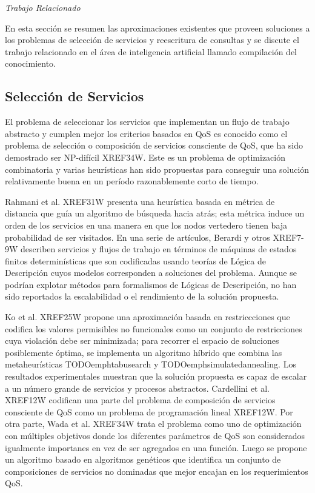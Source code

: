 \documentclass{article}
\begin{document}
\emph{Trabajo Relacionado}

En esta sección se resumen las aproximaciones existentes que proveen soluciones
a los problemas de selección de servicios y reescritura de consultas y se
discute el trabajo relacionado en el área de inteligencia artificial llamado
compilación del conocimiento.

\subsection{Selección de Servicios}

El problema de seleccionar los servicios que implementan un flujo de trabajo
abstracto y cumplen mejor los criterios basados en QoS es conocido como el
problema de selección o composición de servicios consciente de QoS, que ha sido
demostrado ser NP-difícil XREF34W. Este es un problema de optimización
combinatoria y varias heurísticas han sido propuestas para conseguir una
solución relativamente buena en un período razonablemente corto de tiempo.

Rahmani et al. XREF31W presenta una heurística basada en métrica de distancia
que guía un algoritmo de búsqueda hacia atrás; esta métrica induce un orden de
los servicios en una manera en que los nodos vertedero tienen baja probabilidad
de ser visitados. En una serie de artículos, Berardi y otros XREF7-9W describen
servicios y flujos de trabajo en términos de máquinas de estados finitos
determinísticas que son codificadas usando teorías de Lógica de Descripción
cuyos modelos corresponden a soluciones del problema. Aunque se podrían explotar
métodos para formalismos de Lógicas de Descripción, no han sido reportados la
escalabilidad o el rendimiento de la solución propuesta.

Ko et al. XREF25W propone una aproximación basada en restriccciones que codifica
los valores permisibles no funcionales como un conjunto de restricciones cuya
violación debe ser minimizada; para recorrer el espacio de soluciones
posiblemente óptima, se implementa un algoritmo híbrido que combina las
metaheurísticas TODOemphtabusearch y TODOemphsimulatedannealing. Los resultados
experimentales muestran que la solución propuesta es capaz de escalar a un
número grande de servicios y procesos abstractos. Cardellini et al. XREF12W
codifican una parte del problema de composición de servicios consciente de QoS
como un problema de programación lineal XREF12W. Por otra parte, Wada et al.
XREF34W trata el problema como uno de optimización con múltiples objetivos donde
los diferentes parámetros de QoS son considerados igualmente importanes en vez
de ser agregados en una función. Luego se propone un algoritmo basado en
algoritmos genéticos que identifica un conjunto de composiciones de servicios
no dominadas que mejor encajan en los requerimientos QoS.
\end{document}

